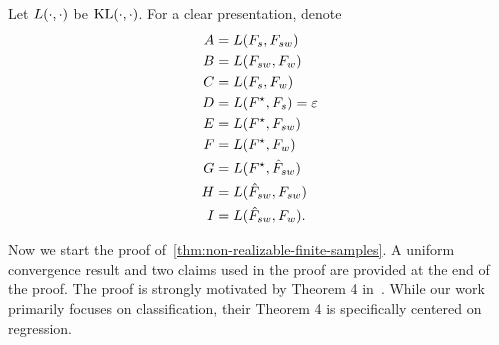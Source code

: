 Let $L(\cdot, \cdot)$ be $\mathrm{KL}(\cdot, \cdot)$.
For a clear presentation, denote
\begin{align*}
    A &= L(F_s, F_{sw})\\
    B &=L(F_{sw}, F_w) \\
    C &= L(F_s, F_w)\\
    D &= L(F^\star, F_s) =\varepsilon\\
    E &= L(F^\star, F_{sw}) \\
    F &= L(F^\star, F_w) \\
    G &= L(F^\star, \hat{F}_{sw}) \\
    H &= L(\hat{F}_{sw}, F_{sw}) \\
    I &= L(\hat{F}_{sw}, F_w).
\end{align*}

Now we start the proof of~\cref{thm:non-realizable-finite-samples}.
A uniform convergence result and two claims used in the proof are provided at the end of the proof.
The proof is strongly motivated by Theorem 4 in~\citet{yao2025understanding}.
While our work primarily focuses on classification, their Theorem 4 is specifically centered on regression.


